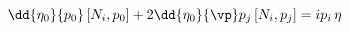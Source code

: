 \begin{equation}\label{19}
\dd{\eta_0}{p_0}\, [N_i, p_0] + 2 \dd{\eta_0}{\vp} p_j\, [N_i, p_j] = i p_i\,
\eta
\end{equation}

